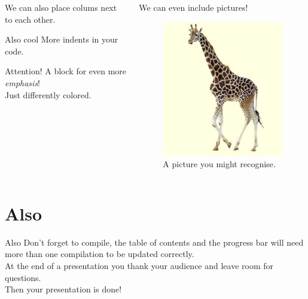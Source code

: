 \documentclass{beamer}
\theoremstyle{definition}
\theoremstyle{example}
\begin{document}
\begin{frame}
\begin{columns}[T]
	\begin{column}[T]{5cm}
		We can also place colums next to each other.\\
		\begin{block}{Also cool}
			More indents in your code.
		\end{block}
		\begin{alertblock}{Attention!}
			A block for even more \emph{emphasis}!\\
			Just differently colored.
		\end{alertblock}
	\end{column}
	\begin{column}[T]{5cm}
		We can even include pictures!
		\begin{figure}
			\includegraphics[scale=0.4]{Giraffe_klein.jpg}
			\caption{A picture you might recognise.}
		\end{figure}
		
	\end{column}
\end{columns}
\end{frame}


\section{Also}


\begin{frame}{Also}
Don't forget to compile, the table of contents and the progress bar will need more than one compilation to be updated correctly.\\
At the end of a presentation you thank your audience and leave room for questions.\\
Then your presentation is done!
\end{frame}
\end{document}
